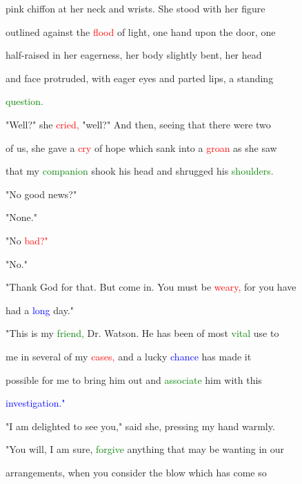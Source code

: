  pink chiffon at her neck and wrists. She stood with her figure

 outlined against the \textcolor{red}{flood} of light, one hand upon the door, one

 half-raised in her \textcolor{BurntOrange}{eagerness,} her body slightly bent, her head

 and face protruded, with \textcolor{BurntOrange}{eager} eyes and parted lips, a standing

 \textcolor{green}{question.}



 "Well?" she \textcolor{red}{cried,} "well?" And then, seeing that there were two

 of us, she gave a \textcolor{red}{cry} of \textcolor{BurntOrange}{hope} which sank into a \textcolor{red}{groan} as she saw

 that my \textcolor{green}{companion} shook his head and shrugged his \textcolor{green}{shoulders.}



 "No \textcolor{BurntOrange}{good} news?"



 "None."



 "No \textcolor{red}{bad?"}



 "No."



 "Thank \textcolor{BurntOrange}{God} for that. But come in. You must be \textcolor{red}{weary,} for you have

 had a \textcolor{blue}{long} day."



 "This is my \textcolor{green}{friend,} Dr. Watson. He has been of most \textcolor{green}{vital} use to

 me in several of my \textcolor{red}{cases,} and a \textcolor{BurntOrange}{lucky} \textcolor{blue}{chance} has made it

 possible for me to bring him out and \textcolor{green}{associate} him with this

 \textcolor{blue}{investigation."}



 "I am \textcolor{BurntOrange}{delighted} to see you," said she, pressing my hand warmly.

 "You will, I am sure, \textcolor{green}{forgive} anything that may be wanting in our

 arrangements, when you consider the blow which has come so

